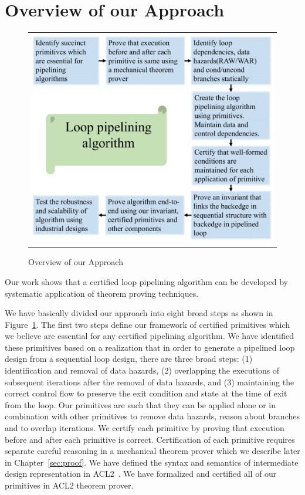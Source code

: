 \section {Overview of our Approach}

\begin{figure}[t!]
\begin{center}
\begin{tabular}{c}
\includegraphics[width=4.75in]{fig-proposal/our-approach}
\end{tabular}
\end{center}
\caption{Overview of our Approach}
\label{fig:our-approach}
\end{figure}

Our work shows that a certified loop pipelining algorithm can be developed by systematic application of theorem proving techniques. 

We have basically divided our approach into eight broad steps as shown in Figure~\ref{fig:our-approach}. The first two steps define our framework of certified primitives which we believe are essential for any certified pipelining algorithm. We have identified these primitives based on a realization that in order to generate a pipelined loop design from a sequential loop design, there are three broad steps: (1) identification and removal of data hazards, (2) overlapping the executions of subsequent iterations after the removal of data hazards, and (3) maintaining the correct control flow to preserve the exit condition and state at the time of exit from the loop. Our primitives are such that they can be applied alone or in combination with other primitives to remove data hazards, reason about branches and to overlap iterations. We certify each primitive by proving that execution before and after each primitive is correct. Certification of each primitive requires separate careful reasoning in a mechanical theorem prover which we describe later in Chapter~\ref{sec:proof}. We have defined the syntax and semantics of intermediate design representation in ACL2~\cite{car,acl2-sandip}. We have formalized and certified all of our primitives in ACL2 theorem prover.
 
